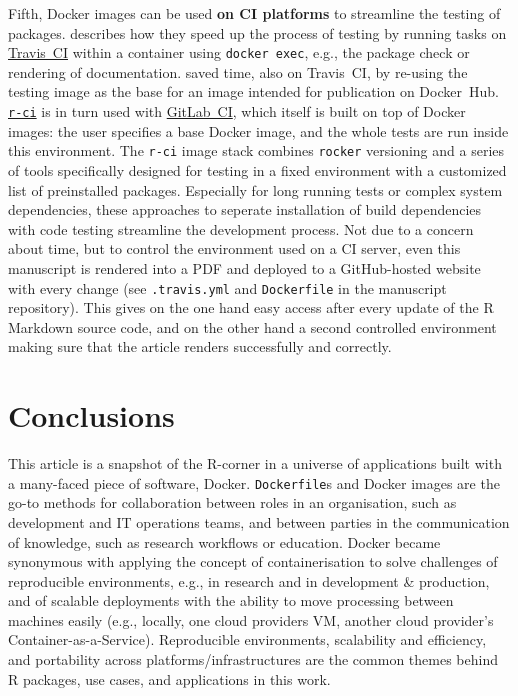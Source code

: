 Fifth, Docker images can be used \textbf{on CI platforms} to streamline
the testing of packages. \citet{ye_docker_2019} describes how they speed
up the process of testing by running tasks on
\href{https://travis-ci.org/}{Travis~CI} within a container using
\texttt{docker\ exec}, e.g., the package check or rendering of
documentation. \citet{cardozo_faster_2018} saved time, also on
Travis~CI, by re-using the testing image as the base for an image
intended for publication on Docker~Hub.
\href{https://github.com/ColinFay/r-ci}{\texttt{r-ci}} is in turn used
with \href{https://docs.gitlab.com/ee/ci/}{GitLab~CI}, which itself is
built on top of Docker images: the user specifies a base Docker image,
and the whole tests are run inside this environment. The \texttt{r-ci}
image stack combines \texttt{rocker} versioning and a series of tools
specifically designed for testing in a fixed environment with a
customized list of preinstalled packages. Especially for long running
tests or complex system dependencies, these approaches to seperate
installation of build dependencies with code testing streamline the
development process. Not due to a concern about time, but to control the
environment used on a CI server, even this manuscript is rendered into a
PDF and deployed to a GitHub-hosted website with every change (see
\texttt{.travis.yml} and \texttt{Dockerfile} in the manuscript
repository). This gives on the one hand easy access after every update
of the R Markdown source code, and on the other hand a second controlled
environment making sure that the article renders successfully and
correctly.

\hypertarget{conclusions}{%
\section{Conclusions}\label{conclusions}}

\label{conclusions}

This article is a snapshot of the R-corner in a universe of applications
built with a many-faced piece of software, Docker. \texttt{Dockerfile}s
and Docker images are the go-to methods for collaboration between roles
in an organisation, such as development and IT operations teams, and
between parties in the communication of knowledge, such as research
workflows or education. Docker became synonymous with applying the
concept of containerisation to solve challenges of reproducible
environments, e.g., in research and in development \& production, and of
scalable deployments with the ability to move processing between
machines easily (e.g., locally, one cloud providers VM, another cloud
provider's Container-as-a-Service). Reproducible environments,
scalability and efficiency, and portability across
platforms/infrastructures are the common themes behind R packages, use
cases, and applications in this work.

